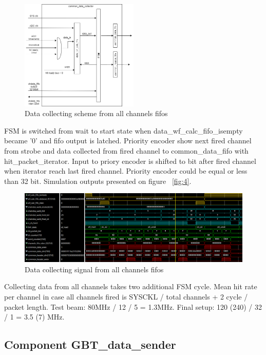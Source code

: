 \documentclass{article}
\begin{document}
\begin{figure}[H]
	\centering 
	\includegraphics[width=0.5\textwidth]{ADC_common_event_collection.png}
	\caption{\label{fig:6} Data collecting scheme from all channels fifos}
\end{figure}


FSM is switched from wait to start state when data\_wf\_calc\_fifo\_isempty became '0' and fifo output is latched. Priority encoder show next fired channel from strobe and data collected from fired channel to common\_data\_fifo with hit\_packet\_iterator. Input to priory encoder is shifted to bit after fired channel when iterator reach last fired channel. Priority encoder could be equal or less than 32 bit. Simulation outputs presented on figure ~\ref{fig:4}.

\begin{figure}[H]
	\centering 
	\includegraphics[width=1.0\textwidth]{ADC_common_data_collector_wave.png}
	\caption{\label{fig:7} Data collecting signal from all channels fifos}
\end{figure}

Collecting data from all channels takes two additional FSM cycle. Mean hit rate per channel in case all channels fired is SYSCKL / total channels + 2 cycle / packet length. Test beam: 80MHz / 12 / 5 = 1.3MHz. Final setup: 120 (240) / 32 / 1 = 3.5 (7) MHz.


\subsection{Component GBT\_data\_sender}
\end{document}
